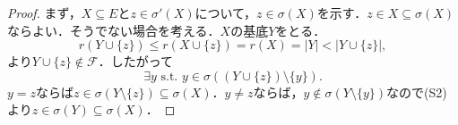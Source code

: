 \documentclass[xelatex,ja=standard,a4paper,14pt,everyparhook=compat]{bxjsarticle}
\theoremstyle{definition}
\begin{document}
\begin{proof}
    まず，$X \subseteq E$と$z \in \sigma'(X)$について，$z \in \sigma(X)$を示す．$z \in X \subseteq \sigma(X)$ならよい．そうでない場合を考える．$X$の基底$Y$をとる． \begin{equation*}
        r(Y \cup \{z\}) \leq r(X \cup \{z\}) = r(X) = |Y| < |Y \cup \{z\}|,
    \end{equation*}
    より$Y \cup \{z\} \notin \mathcal{F}$．したがって \begin{equation*}
        \text{$\exists y$ s.t. $y \in \sigma((Y \cup \{z\}) \setminus \{y\})$.}
    \end{equation*}
    $y = z$ならば$z \in \sigma(Y \setminus \{z\}) \subseteq \sigma(X)$．$y \neq z$ならば，$y \notin \sigma(Y \setminus \{y\})$なので(S2)より$z \in \sigma(Y) \subseteq \sigma(X)$．
\end{proof}
\end{document}
